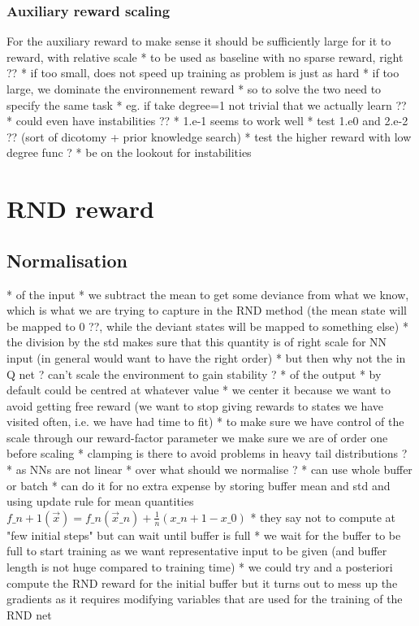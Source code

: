 \documentclass[a4paper, 12pt,oneside]{article}
\begin{document}
        \subsubsection{Auxiliary reward scaling}
        For the auxiliary reward to make sense it should be sufficiently large for it to 
        reward, with relative scale
          * to be used as baseline with no sparse reward, right ?? 
          * if too small, does not speed up training as problem is just as hard
          * if too large, we dominate the environnement reward 
            * so to solve the two need to specify the same task 
            * eg. if take degree=1 not trivial that we actually learn ??
            * could even have instabilities ??
          * 1.e-1 seems to work well 
            * test 1.e0 and 2.e-2 ?? (sort of dicotomy + prior knowledge search)
            * test the higher reward with low degree func ? 
            * be on the lookout for instabilities 
        \section{RND reward}
            \subsection{Normalisation} 
            * of the input 
            * we subtract the mean to get some deviance from what we know, which is what we are trying to capture in the RND method (the mean state will be mapped to 0 ??, while the deviant states will be mapped to something else)
            * the division by the std makes sure that this quantity is of right scale for NN input (in general would want to have the right order) 
                * but then why not the in Q net ? can't scale the environment to gain stability ?
            * of the output 
            * by default could be centred at whatever value
            * we center it because we want to avoid getting free reward (we want to stop giving rewards to states we have visited often, i.e. we have had time to fit)
            * to make sure we have control of the scale through our reward-factor parameter we make sure we are of order one before scaling  
                * clamping is there to avoid problems in heavy tail distributions ?
                * as NNs are not linear 
            * over what should we normalise ?
                * can use whole buffer or batch 
                * can do it for no extra expense by storing buffer mean and std and using update rule for mean quantities $f\_{n+1}(\vec x)=f\_n(\vec x\_n)+\frac{1}{n}(x\_{n+1}-x\_0)$ 
                * they say not to compute at "few initial steps" but can wait until buffer is full 
                    * we wait for the buffer to be full to start training as we want representative input to be given (and buffer length is not huge compared to training time)  
                    * we could try and a posteriori compute the RND reward for the initial buffer but it turns out to mess up the gradients as it requires modifying variables that are used for the training of the RND net
\end{document}
